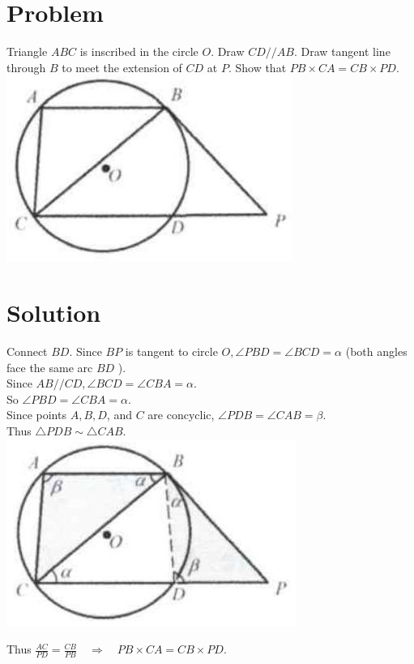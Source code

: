 \documentclass{article}
\begin{document}
\section*{Problem}
Triangle \(A B C\) is inscribed in the circle \(O\). Draw \(C D / / A B\). Draw tangent line through \(B\) to meet the extension of \(C D\) at \(P\). Show that \(P B \times C A=C B \times P D\).\\
\centering
\includegraphics[width=\textwidth]{images/169.jpg}

\section*{Solution}
Connect \(B D\). Since \(B P\) is tangent to circle \(O, \angle P B D=\angle B C D=\alpha\) (both angles face the same arc \(B D\) ).\\
Since \(A B / / C D, \angle B C D=\angle C B A=\alpha\).\\
So \(\angle P B D=\angle C B A=\alpha\).\\
Since points \(A, B, D\), and \(C\) are concyclic, \(\angle P D B=\angle C A B=\beta\).\\
Thus \(\triangle P D B \sim \triangle C A B\).\\
\centering
\includegraphics[width=\textwidth]{images/172.jpg}

Thus \(\frac{A C}{P D}=\frac{C B}{P B} \quad \Rightarrow \quad P B \times C A=C B \times P D\).
\end{document}
